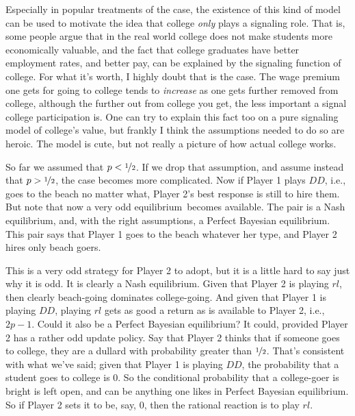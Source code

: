 \documentclass[openany]{book}
\newcommand{\eqm}{equilibrium}
\begin{document}
Especially in popular treatments of the case, the existence of this kind of model can be used to motivate the idea that college \textit{only} plays a signaling role. That is, some people argue that in the real world college does not make students more economically valuable, and the fact that college graduates have better employment rates, and better pay, can be explained by the signaling function of college. For what it's worth, I highly doubt that is the case. The wage premium one gets for going to college tends to \textit{increase} as one gets further removed from college, although the further out from college you get, the less important a signal college participation is. One can try to explain this fact too on a pure signaling model of college's value, but frankly I think the assumptions needed to do so are heroic. The model is cute, but not really a picture of how actual college works.

So far we assumed that $p < \nicefrac{1}{2}$. If we drop that assumption, and assume instead that $p > \nicefrac{1}{2}$, the case becomes more complicated. Now if Player 1 plays $DD$, i.e., goes to the beach no matter what, Player 2's best response is still to hire them. But note that now a very odd \eqm\ becomes available. The pair  is a Nash \eqm, and, with the right assumptions, a Perfect Bayesian \eqm. This pair says that Player 1 goes to the beach whatever her type, and Player 2 hires only beach goers.

This is a very odd strategy for Player 2 to adopt, but it is a little hard to say just why it is odd. It is clearly a Nash \eqm. Given that Player 2 is playing $rl$, then clearly beach-going dominates college-going. And given that Player 1 is playing $DD$, playing $rl$ gets as good a return as is available to Player 2, i.e., $2p-1$. Could it also be a Perfect Bayesian equilibrium? It could, provided Player 2 has a rather odd update policy. Say that Player 2 thinks that if someone goes to college, they are a dullard with probability greater than $\nicefrac{1}{2}$. That's consistent with what we've said; given that Player 1 is playing $DD$, the probability that a student goes to college is 0. So the conditional probability that a college-goer is bright is left open, and can be anything one likes in Perfect Bayesian \eqm. So if Player 2 sets it to be, say, 0, then the rational reaction is to play $rl$.
\end{document}
